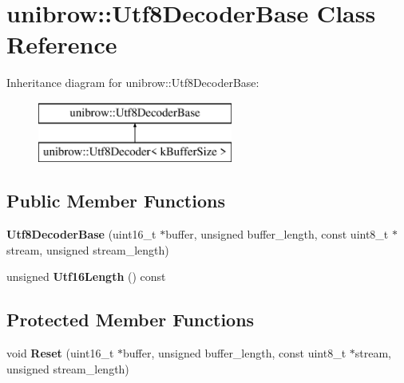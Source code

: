 \hypertarget{classunibrow_1_1_utf8_decoder_base}{}\section{unibrow\+:\+:Utf8\+Decoder\+Base Class Reference}
\label{classunibrow_1_1_utf8_decoder_base}
Inheritance diagram for unibrow\+:\+:Utf8\+Decoder\+Base\+:\begin{figure}[H]
\begin{center}
\leavevmode
\includegraphics[height=2.000000cm]{classunibrow_1_1_utf8_decoder_base}
\end{center}
\end{figure}
\subsection*{Public Member Functions}
\begin{DoxyCompactItemize}
\item 
\hypertarget{classunibrow_1_1_utf8_decoder_base_a57639d8aab1ed8453a3892b3cb9b6be5}{}{\bfseries Utf8\+Decoder\+Base} (uint16\+\_\+t $\ast$buffer, unsigned buffer\+\_\+length, const uint8\+\_\+t $\ast$stream, unsigned stream\+\_\+length)\label{classunibrow_1_1_utf8_decoder_base_a57639d8aab1ed8453a3892b3cb9b6be5}

\item 
\hypertarget{classunibrow_1_1_utf8_decoder_base_a047969a19fc192d7ca14a2d2dfb2a0a2}{}unsigned {\bfseries Utf16\+Length} () const \label{classunibrow_1_1_utf8_decoder_base_a047969a19fc192d7ca14a2d2dfb2a0a2}

\end{DoxyCompactItemize}
\subsection*{Protected Member Functions}
\begin{DoxyCompactItemize}
\item 
\hypertarget{classunibrow_1_1_utf8_decoder_base_ae202499b7e31ff4bda21bd242acd826e}{}void {\bfseries Reset} (uint16\+\_\+t $\ast$buffer, unsigned buffer\+\_\+length, const uint8\+\_\+t $\ast$stream, unsigned stream\+\_\+length)\label{classunibrow_1_1_utf8_decoder_base_ae202499b7e31ff4bda21bd242acd826e}

\end{DoxyCompactItemize}
